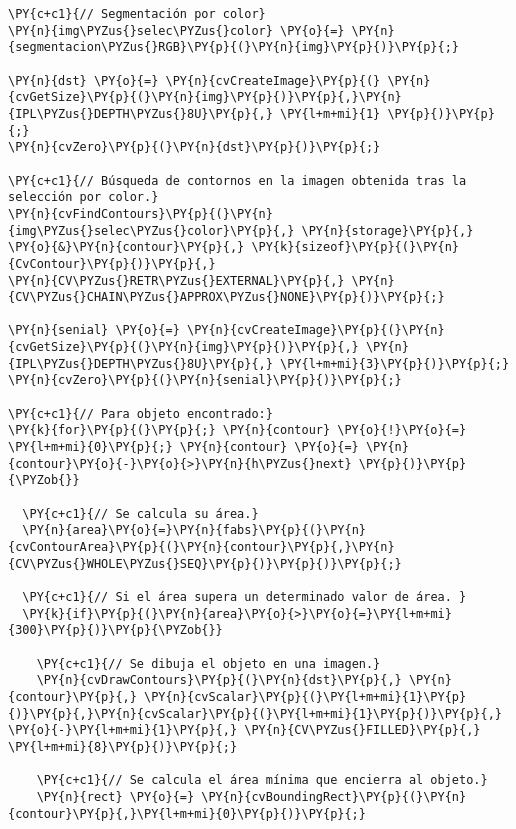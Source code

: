 \begin{Verbatim}[commandchars=\\\{\}]
\PY{c+c1}{// Segmentación por color}
\PY{n}{img\PYZus{}selec\PYZus{}color} \PY{o}{=} \PY{n}{segmentacion\PYZus{}RGB}\PY{p}{(}\PY{n}{img}\PY{p}{)}\PY{p}{;}

\PY{n}{dst} \PY{o}{=} \PY{n}{cvCreateImage}\PY{p}{(} \PY{n}{cvGetSize}\PY{p}{(}\PY{n}{img}\PY{p}{)}\PY{p}{,}\PY{n}{IPL\PYZus{}DEPTH\PYZus{}8U}\PY{p}{,} \PY{l+m+mi}{1} \PY{p}{)}\PY{p}{;}
\PY{n}{cvZero}\PY{p}{(}\PY{n}{dst}\PY{p}{)}\PY{p}{;}

\PY{c+c1}{// Búsqueda de contornos en la imagen obtenida tras la selección por color.}
\PY{n}{cvFindContours}\PY{p}{(}\PY{n}{img\PYZus{}selec\PYZus{}color}\PY{p}{,} \PY{n}{storage}\PY{p}{,} \PY{o}{&}\PY{n}{contour}\PY{p}{,} \PY{k}{sizeof}\PY{p}{(}\PY{n}{CvContour}\PY{p}{)}\PY{p}{,}
\PY{n}{CV\PYZus{}RETR\PYZus{}EXTERNAL}\PY{p}{,} \PY{n}{CV\PYZus{}CHAIN\PYZus{}APPROX\PYZus{}NONE}\PY{p}{)}\PY{p}{;}

\PY{n}{senial} \PY{o}{=} \PY{n}{cvCreateImage}\PY{p}{(}\PY{n}{cvGetSize}\PY{p}{(}\PY{n}{img}\PY{p}{)}\PY{p}{,} \PY{n}{IPL\PYZus{}DEPTH\PYZus{}8U}\PY{p}{,} \PY{l+m+mi}{3}\PY{p}{)}\PY{p}{;}
\PY{n}{cvZero}\PY{p}{(}\PY{n}{senial}\PY{p}{)}\PY{p}{;}     

\PY{c+c1}{// Para objeto encontrado:}
\PY{k}{for}\PY{p}{(}\PY{p}{;} \PY{n}{contour} \PY{o}{!}\PY{o}{=} \PY{l+m+mi}{0}\PY{p}{;} \PY{n}{contour} \PY{o}{=} \PY{n}{contour}\PY{o}{-}\PY{o}{>}\PY{n}{h\PYZus{}next} \PY{p}{)}\PY{p}{\PYZob{}}
  
  \PY{c+c1}{// Se calcula su área.}
  \PY{n}{area}\PY{o}{=}\PY{n}{fabs}\PY{p}{(}\PY{n}{cvContourArea}\PY{p}{(}\PY{n}{contour}\PY{p}{,}\PY{n}{CV\PYZus{}WHOLE\PYZus{}SEQ}\PY{p}{)}\PY{p}{)}\PY{p}{;}
  
  \PY{c+c1}{// Si el área supera un determinado valor de área. }
  \PY{k}{if}\PY{p}{(}\PY{n}{area}\PY{o}{>}\PY{o}{=}\PY{l+m+mi}{300}\PY{p}{)}\PY{p}{\PYZob{}}
    
    \PY{c+c1}{// Se dibuja el objeto en una imagen.}
    \PY{n}{cvDrawContours}\PY{p}{(}\PY{n}{dst}\PY{p}{,} \PY{n}{contour}\PY{p}{,} \PY{n}{cvScalar}\PY{p}{(}\PY{l+m+mi}{1}\PY{p}{)}\PY{p}{,}\PY{n}{cvScalar}\PY{p}{(}\PY{l+m+mi}{1}\PY{p}{)}\PY{p}{,} \PY{o}{-}\PY{l+m+mi}{1}\PY{p}{,} \PY{n}{CV\PYZus{}FILLED}\PY{p}{,} \PY{l+m+mi}{8}\PY{p}{)}\PY{p}{;}
    
    \PY{c+c1}{// Se calcula el área mínima que encierra al objeto.}
    \PY{n}{rect} \PY{o}{=} \PY{n}{cvBoundingRect}\PY{p}{(}\PY{n}{contour}\PY{p}{,}\PY{l+m+mi}{0}\PY{p}{)}\PY{p}{;} 
    

\end{Verbatim}
